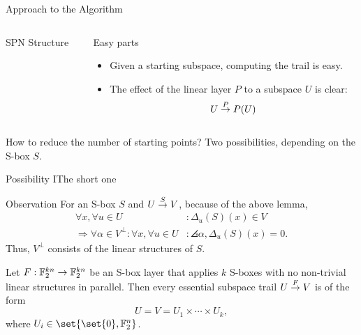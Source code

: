 \begin{frame}{Approach to the Algorithm}
\begin{columns}[onlytextwidth]
\begin{column}{0.6\textwidth}
\begin{block}{SPN Structure\vphantom{y}}
                \vspace{0.5em}
            \end{block}
        \end{column}
        \begin{column}{0.3325\textwidth}
            \begin{block}{Easy parts}
                \vspace{4mm}
                \begin{itemize}
                    \item Given a starting subspace, computing the trail is easy.
                    \item The effect of the linear layer $P$ to a subspace $U$ is clear:
                          \begin{equation*}
                              U \stackrel{P}{\rightarrow} P(U)
                          \end{equation*}
                \end{itemize}
                \vspace{4mm}
            \end{block}
        \end{column}
    \end{columns}
    \begin{block}{How to reduce the number of starting points?}
        Two possibilities, depending on the S-box $S$.
    \end{block}
\end{frame}

\begin{frame}{Possibility I}{The short one}
    \begin{block}{Observation}
        \vspace{0.25em}
        For an S-box $S$ and $U \stackrel{S}{\rightarrow} V$, because of the above lemma,
        \begin{align*}
            \forall x, \forall u \in U&: \Delta_u(S)(x) \in V \\
            \Rightarrow \forall \alpha \in V^\perp : \forall x, \forall u \in U &: \angles{\alpha, \Delta_u(S)(x)} = 0.
        \end{align*}
        Thus, $V^\perp$ consists of the linear structures of $S$.
    \end{block}
    \begin{theorem}
        Let $F : \mathbb{F}_2^{kn} \to \mathbb{F}_2^{kn}$ be an S-box layer that applies $k$ S-boxes with no non-trivial linear structures in parallel.
        Then every essential subspace trail $U \stackrel{F}{\rightarrow} V$ is of the form
        \begin{equation*}
            U = V = U_1 \times \cdots \times U_k,
        \end{equation*}
        where $U_i \in \set{\set{0}, \F_2^n}$.
    \end{theorem}
\end{frame}

